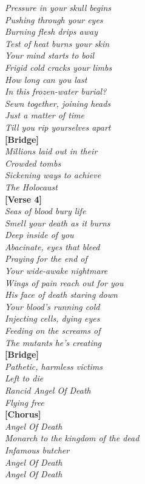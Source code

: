 \documentclass[twocolumn,10pt]{article}
\begin{document}
\begin{center}
			\textit{Pressure in your skull begins}\\
			\textit{Pushing through your eyes}\\
			\textit{Burning flesh drips away}\\
			\textit{Test of heat burns your skin}\\
			\textit{Your mind starts to boil}\\
			\textit{Frigid cold cracks your limbs}\\
			\textit{How long can you last}\\
			\textit{In this frozen-water burial?}\\
			\textit{Sewn together, joining heads}\\
			\textit{Just a matter of time}\\
			\textit{Till you rip yourselves apart}
			\vspace{10pt}\\
			\textbf{[Bridge]}\\
			\textit{Millions laid out in their}\\
			\textit{Crowded tombs}\\
			\textit{Sickening ways to achieve}\\
			\textit{The Holocaust}
			\vspace{10pt}\\
			\textbf{[Verse 4]}\\
			\textit{Seas of blood bury life}\\
			\textit{Smell your death as it burns}\\
			\textit{Deep inside of you}\\
			\textit{Abacinate, eyes that bleed}\\
			\textit{Praying for the end of}\\
			\textit{Your wide-awake nightmare}\\
			\textit{Wings of pain reach out for you}\\
			\textit{His face of death staring down}\\
			\textit{Your blood's running cold}\\
			\textit{Injecting cells, dying eyes}\\
			\textit{Feeding on the screams of}\\
			\textit{The mutants he's creating}
			\vspace{10pt}\\
			\textbf{[Bridge]}\\
			\textit{Pathetic, harmless victims}\\
			\textit{Left to die}\\
			\textit{Rancid Angel Of Death}\\
			\textit{Flying free}
			\vspace{10pt}\\
			\textbf{[Chorus]}\\
			\textit{Angel Of Death}\\
			\textit{Monarch to the kingdom of the dead}\\
			\textit{Infamous butcher}\\
			\textit{Angel Of Death}\\
			\textit{Angel Of Death}		
			\end{center}
			\clearpage
\end{document}
